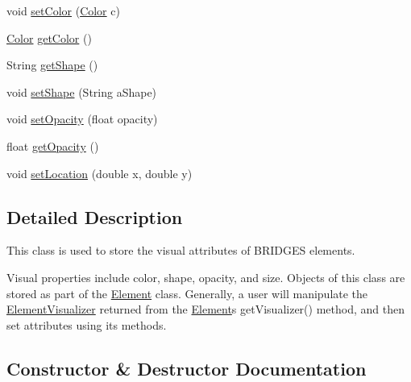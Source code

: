 \begin{DoxyCompactItemize}
\item 
void \hyperlink{classbridges_1_1base_1_1_element_visualizer_a33172ab908f3b6f9740727b0bfe91565}{set\+Color} (\hyperlink{classbridges_1_1base_1_1_color}{Color} c)
\item 
\hyperlink{classbridges_1_1base_1_1_color}{Color} \hyperlink{classbridges_1_1base_1_1_element_visualizer_a3bf821b9bfa02746882bac934ce4fb8e}{get\+Color} ()
\item 
String \hyperlink{classbridges_1_1base_1_1_element_visualizer_a8ef0825745e49f32b57e4bf6c891b57e}{get\+Shape} ()
\item 
void \hyperlink{classbridges_1_1base_1_1_element_visualizer_ac3bad991904c8ad23e5233b341381d93}{set\+Shape} (String a\+Shape)
\item 
void \hyperlink{classbridges_1_1base_1_1_element_visualizer_a932f62eb1bd0c92da265a7f903dd0790}{set\+Opacity} (float opacity)
\item 
float \hyperlink{classbridges_1_1base_1_1_element_visualizer_ab86ff39f17f8d1766670b18be88b5492}{get\+Opacity} ()
\item 
void \hyperlink{classbridges_1_1base_1_1_element_visualizer_a04f3416447f2042de7cd21ce5b6a0598}{set\+Location} (double x, double y)
\end{DoxyCompactItemize}


\subsection{Detailed Description}
This class is used to store the visual attributes of B\+R\+I\+D\+G\+ES elements. 

Visual properties include color, shape, opacity, and size. Objects of this class are stored as part of the \hyperlink{classbridges_1_1base_1_1_element}{Element} class. Generally, a user will manipulate the \hyperlink{classbridges_1_1base_1_1_element_visualizer}{Element\+Visualizer} returned from the \hyperlink{classbridges_1_1base_1_1_element}{Element}\textquotesingle{}s get\+Visualizer() method, and then set attributes using its methods. 

\subsection{Constructor \& Destructor Documentation}
\hypertarget{classbridges_1_1base_1_1_element_visualizer_acbca874876ec1e8dbbde6484a4fc056e}{}\label{classbridges_1_1base_1_1_element_visualizer_acbca874876ec1e8dbbde6484a4fc056e} 
